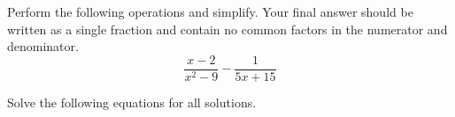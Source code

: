 \begin{questions}
\question[7] Perform the following operations and simplify. Your final answer should be
written as a single fraction and contain no common factors in the numerator and
denominator.
%	
 \[\dfrac{x-2}{x^2-9} -\dfrac{1}{5x+15}\]
	\vspace{1.7in}
\vfill


\newpage

\question Solve the following equations for all solutions. %
\end{questions}
